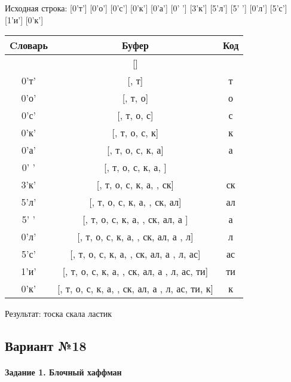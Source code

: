 \documentclass[a4paper, 12pt]{article}
\begin{document}
Исходная строка: [0'т'] [0'о'] [0'с'] [0'к'] [0'а'] [0' '] [3'к'] [5'л'] [5' '] [0'л'] [5'с'] [1'и'] [0'к']\\
\begin{table}[h!]
\centering
\begin{tabular}{|c|c|c|}
\hline
 Cловарь & Буфер & Код  \\ \hline
 & [] & 
\\ \hline
0'т' & [, т] & т
\\ \hline
0'о' & [, т, о] & о
\\ \hline
0'с' & [, т, о, с] & с
\\ \hline
0'к' & [, т, о, с, к] & к
\\ \hline
0'а' & [, т, о, с, к, а] & а
\\ \hline
0' ' & [, т, о, с, к, а,  ] &  
\\ \hline
3'к' & [, т, о, с, к, а,  , ск] & ск
\\ \hline
5'л' & [, т, о, с, к, а,  , ск, ал] & ал
\\ \hline
5' ' & [, т, о, с, к, а,  , ск, ал, а ] & а 
\\ \hline
0'л' & [, т, о, с, к, а,  , ск, ал, а , л] & л
\\ \hline
5'с' & [, т, о, с, к, а,  , ск, ал, а , л, ас] & ас
\\ \hline
1'и' & [, т, о, с, к, а,  , ск, ал, а , л, ас, ти] & ти
\\ \hline
0'к' & [, т, о, с, к, а,  , ск, ал, а , л, ас, ти, к] & к
\\ \hline
\end{tabular}
\end{table}

Результат: тоска скала ластик
\pagebreak
\subsection{Вариант №18}
\paragraph{Задание 1. Блочный хаффман \\}
\end{document}
